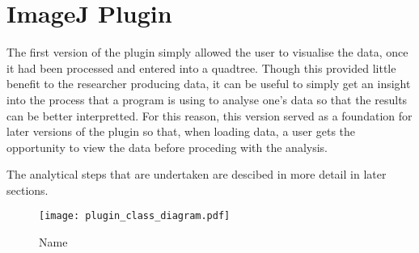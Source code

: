 
\section{ImageJ Plugin}
\label{sec:imagej_plugin}

The first version of the plugin simply allowed the user to visualise the data,
once it had been processed and entered into a quadtree. Though this provided
little benefit to the researcher producing data, it can be useful to simply get
an insight into the process that a program is using to analyse one's data so
that the results can be better interpretted. For this reason, this version
served as a foundation for later versions of the plugin so that, when loading
data, a user gets the opportunity to view the data before proceding with the
analysis.

The analytical steps that are undertaken are descibed in more detail in later
sections.

\begin{figure}[tbhp]
	\centering
	\texttt{[image: plugin\_class\_diagram.pdf]}
	\caption{Name}
	\label{fig:name}
\end{figure}
